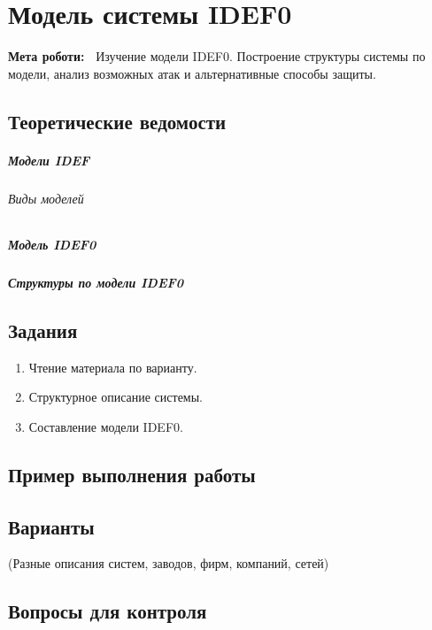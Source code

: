 \chapter{Модель системы IDEF0} \label{chapt4}%
\textbf{Мета роботи:~}%
Изучение модели IDEF0. Построение структуры системы по модели, анализ
возможных атак и альтернативные способы защиты.
\section{Теоретические ведомости} \label{sect3_a}

\paragraph{Модели IDEF}

\subparagraph{Виды моделей}

\paragraph{Модель IDEF0}

\paragraph{Структуры по модели IDEF0}

\section{Задания}\label{sect3_b}
%
\begin{enumerate}
  \item Чтение материала по варианту.
  \item Структурное описание системы.
  \item Составление модели IDEF0.
\end{enumerate}
\section{Пример выполнения работы}\label{sect3_c}
%
\section{Варианты}\label{sect3_d}
%
(Разные описания систем, заводов, фирм, компаний, сетей)
\section{Вопросы для контроля}\label{sect3_e}
%
